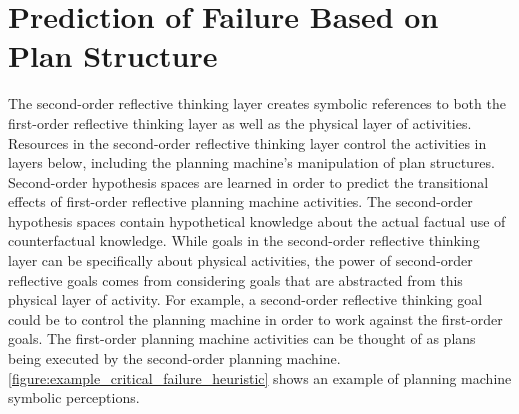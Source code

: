 \section{Prediction of Failure Based on Plan Structure}

The second-order reflective thinking layer creates symbolic references
to both the first-order reflective thinking layer as well as the
physical layer of activities.  Resources in the second-order
reflective thinking layer control the activities in layers below,
including the planning machine's manipulation of plan structures.
Second-order hypothesis spaces are learned in order to predict the
transitional effects of first-order reflective planning machine
activities.  The second-order hypothesis spaces contain hypothetical
knowledge about the actual factual use of counterfactual knowledge.
While goals in the second-order reflective thinking layer can be
specifically about physical activities, the power of second-order
reflective goals comes from considering goals that are abstracted from
this physical layer of activity.  For example, a second-order
reflective thinking goal could be to control the planning machine in
order to work against the first-order goals.  The first-order planning
machine activities can be thought of as plans being executed by the
second-order planning machine.
{\mbox{\autoref{figure:example_critical_failure_heuristic}}} shows an
example of planning machine symbolic perceptions.
